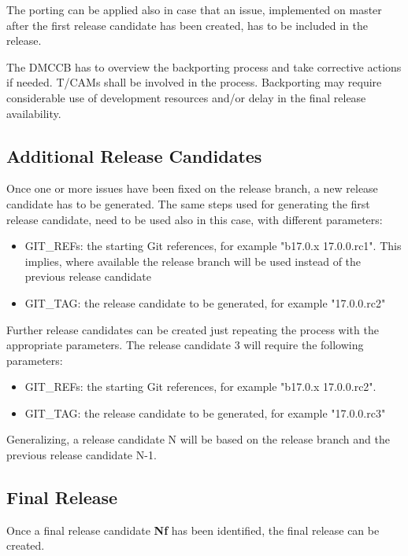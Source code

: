 The porting can be applied also in case that an issue, implemented on master after the first release candidate has been created, has to be included in the release.

The DMCCB has to overview the backporting process and take corrective actions if needed. 
T/CAMs shall be involved in the process.
Backporting may require considerable use of development resources and/or delay in the final release availability.


\subsection{Additional Release Candidates} \label{sec:newrc}

Once one or more issues have been fixed on the release branch, a new release candidate has to be generated.
The same steps used for generating the first release candidate, need to be used also in this case, with different parameters:

\begin{itemize}
\item GIT\_REFs: the starting Git references, for example "b17.0.x 17.0.0.rc1". 
This implies, where available the release branch will be used instead of the previous release candidate
\item GIT\_TAG: the release candidate to be generated, for example "17.0.0.rc2"
\end{itemize}

Further release candidates can be created just repeating the process with the appropriate parameters.
The release candidate 3 will require the following parameters:

\begin{itemize}
\item GIT\_REFs: the starting Git references, for example "b17.0.x 17.0.0.rc2". 
\item GIT\_TAG: the release candidate to be generated, for example "17.0.0.rc3"
\end{itemize}

Generalizing, a release candidate N will be based on the release branch and the previous release candidate N-1.


\subsection{Final Release} \label{sec:finalrelease}

Once a final release candidate \textbf{Nf} has been identified, the final release can be created.

